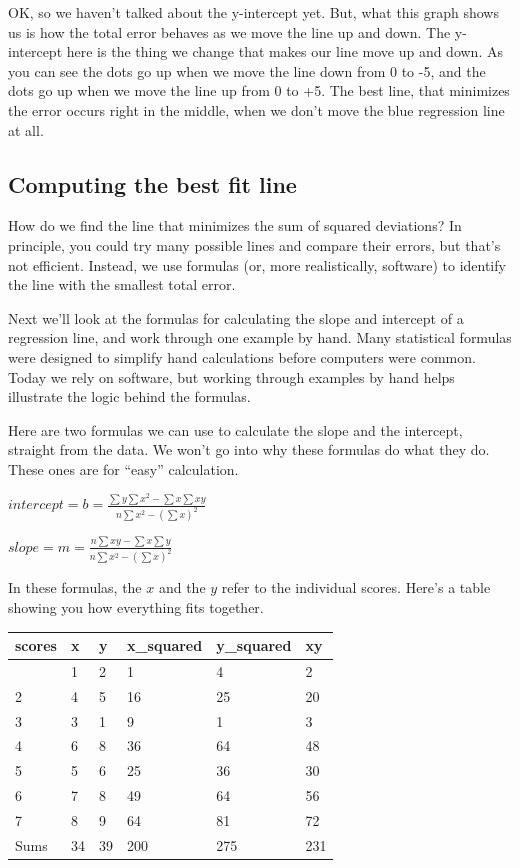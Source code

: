 \documentclass[
  letterpaper,
  DIV=11,
  numbers=noendperiod]{scrreprt}
\begin{document}
OK, so we haven't talked about the y-intercept yet. But, what this graph
shows us is how the total error behaves as we move the line up and down.
The y-intercept here is the thing we change that makes our line move up
and down. As you can see the dots go up when we move the line down from
0 to -5, and the dots go up when we move the line up from 0 to +5. The
best line, that minimizes the error occurs right in the middle, when we
don't move the blue regression line at all.

\subsection{Computing the best fit
line}\label{computing-the-best-fit-line}

How do we find the line that minimizes the sum of squared deviations? In
principle, you could try many possible lines and compare their errors,
but that's not efficient. Instead, we use formulas (or, more
realistically, software) to identify the line with the smallest total
error.

Next we'll look at the formulas for calculating the slope and intercept
of a regression line, and work through one example by hand. Many
statistical formulas were designed to simplify hand calculations before
computers were common. Today we rely on software, but working through
examples by hand helps illustrate the logic behind the formulas.

Here are two formulas we can use to calculate the slope and the
intercept, straight from the data. We won't go into why these formulas
do what they do. These ones are for ``easy'' calculation.

\(intercept = b = \frac{\sum{y}\sum{x^2}-\sum{x}\sum{xy}}{n\sum{x^2}-(\sum{x})^2}\)

\(slope = m = \frac{n\sum{xy}-\sum{x}\sum{y}}{n\sum{x^2}-(\sum{x})^2}\)

In these formulas, the \(x\) and the \(y\) refer to the individual
scores. Here's a table showing you how everything fits together.

\begin{longtable}[]{@{}llllll@{}}
\toprule\noalign{}
scores & x & y & x\_squared & y\_squared & xy \\
\midrule\noalign{}
\endhead
\bottomrule\noalign{}
\endlastfoot
1 & 1 & 2 & 1 & 4 & 2 \\
2 & 4 & 5 & 16 & 25 & 20 \\
3 & 3 & 1 & 9 & 1 & 3 \\
4 & 6 & 8 & 36 & 64 & 48 \\
5 & 5 & 6 & 25 & 36 & 30 \\
6 & 7 & 8 & 49 & 64 & 56 \\
7 & 8 & 9 & 64 & 81 & 72 \\
Sums & 34 & 39 & 200 & 275 & 231 \\
\end{longtable}
\end{document}
